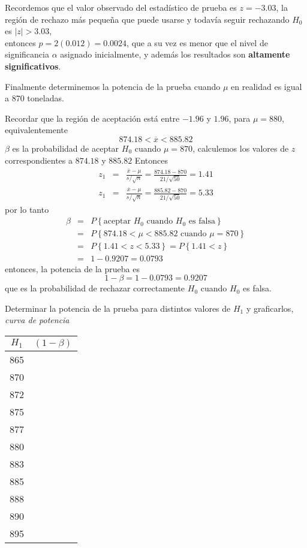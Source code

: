 \begin{frame}
\begin{frame}
\begin{Sol}
Recordemos que el valor observado del estad\'istico de prueba es $z=-3.03$, la regi\'on de rechazo m\'as peque\~na que puede usarse y todav\'ia seguir rechazando $H_{0}$ es $|z|>3.03$, \\
entonces $p=2(0.012)=0.0024$, que a su vez es menor que el nivel de significancia $\alpha$ asignado inicialmente, y adem\'as los resultados son  \textbf{altamente significativos}.


\end{Sol}





Finalmente determinemos la potencia de la prueba cuando $\mu$ en realidad es igual a $870$ toneladas.

Recordar que la regi\'on de aceptaci\'on est\'a entre $-1.96$ y $1.96$, para $\mu=880$, equivalentemente $$874.18<\overline{x}<885.82$$
$\beta$ es la probabilidad de aceptar $H_{0}$ cuando $\mu=870$, calculemos los valores de $z$ correspondientes a $874.18$ y $885.82$ \medskip
Entonces
\begin{eqnarray*}
z_{1}&=&\frac{\overline{x}-\mu}{s/\sqrt{n}}=\frac{874.18-870}{21/\sqrt{50}}=1.41\\
z_{1}&=&\frac{\overline{x}-\mu}{s/\sqrt{n}}=\frac{885.82-870}{21/\sqrt{50}}=5.33
\end{eqnarray*}
por lo tanto
\begin{eqnarray*}
\beta&=&P\left\{\textrm{aceptar }H_{0}\textrm{ cuando }H_{0}\textrm{ es falsa}\right\}\\
&=&P\left\{874.18<\mu<885.82\textrm{ cuando }\mu=870\right\}\\
&=&P\left\{1.41<z<5.33\right\}=P\left\{1.41<z\right\}\\
&=&1-0.9207=0.0793
\end{eqnarray*}
entonces, la potencia de la prueba es
$$1-\beta=1-0.0793=0.9207$$ que es la probabilidad de rechazar correctamente $H_{0}$ cuando $H_{0}$ es falsa.




Determinar la potencia de la prueba para distintos valores de $H_{1}$ y graficarlos, \textit{curva de potencia}
\begin{center}
\begin{tabular}{c||c}
$H_{1}$ & $\left(1-\beta\right)$ \\\hline 
\hline 
865 &  \\ \hline 
870 &  \\ \hline 
872 &  \\ \hline 
875 &  \\ \hline 
877 &  \\ \hline 
880 &  \\ \hline 
883 &  \\ \hline 
885 &  \\ \hline 
888 &  \\ \hline 
890 &  \\ \hline 
895 &  \\ \hline 
\end{tabular} 


\end{center}
\end{frame}
\end{frame}

